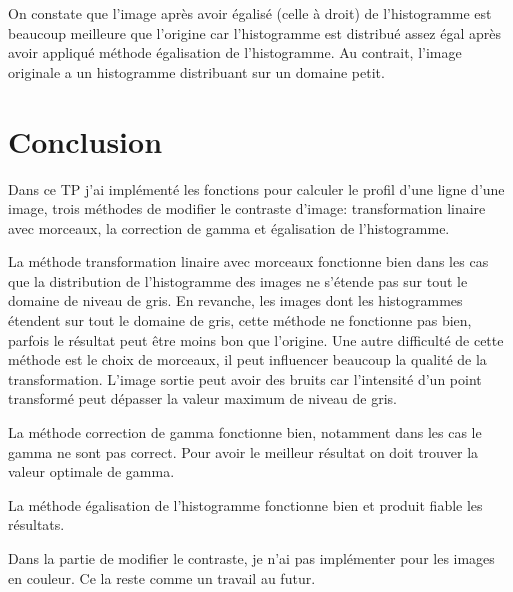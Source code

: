 \documentclass[paper=a4, fontsize=11pt]{scrartcl}	%
\begin{document}
On constate que l'image après avoir égalisé (celle à droit) de l'histogramme est beaucoup meilleure que l'origine car l'histogramme est distribué assez égal après avoir appliqué méthode égalisation de l'histogramme. Au contrait, l'image originale a un histogramme distribuant sur un domaine petit. 
\section{Conclusion}
Dans ce TP j'ai implémenté les fonctions pour calculer le profil d'une ligne d'une image, trois méthodes de modifier le contraste d'image: transformation linaire avec morceaux, la correction de gamma et égalisation de l'histogramme. 

La méthode transformation linaire avec morceaux fonctionne bien dans les cas que la distribution de l'histogramme des images ne s'étende pas sur tout le domaine de niveau de gris. En revanche, les images dont les histogrammes étendent sur tout le domaine de gris, cette méthode ne fonctionne pas bien, parfois le résultat peut être moins bon que l'origine. Une autre difficulté de cette méthode est le choix de morceaux, il peut influencer beaucoup la qualité de la transformation. L'image sortie peut avoir des bruits car l'intensité d'un point transformé peut dépasser la valeur maximum de niveau de gris.

La méthode correction de gamma fonctionne bien, notamment dans les cas le gamma ne sont pas correct. Pour avoir le meilleur résultat on doit trouver la valeur optimale de gamma.

La méthode égalisation de l'histogramme fonctionne bien et produit fiable les résultats.

Dans la partie de modifier le contraste, je n'ai pas implémenter pour les images en couleur. Ce la reste comme un travail au futur.
\end{document}
